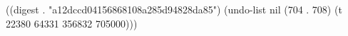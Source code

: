 
((digest . "a12dccd04156868108a285d94828da85") (undo-list nil (704 . 708) (t 22380 64331 356832 705000)))
